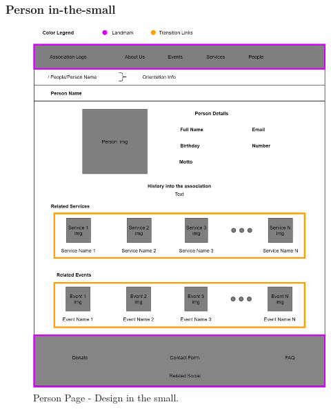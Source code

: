 \subsubsection{Person in-the-small}
\begin{figure}[h!]
		\centering
		\begin{minipage}[b]{1\textwidth}
    			\includegraphics[width=\textwidth]{./assets/persondetails.png}
			\caption{Person Page - Design in the small.}
		\end{minipage}
\end{figure}
\FloatBarrier

\clearpage

